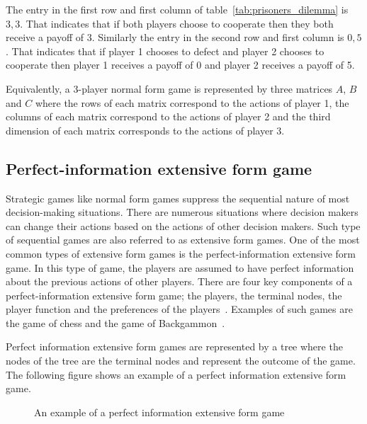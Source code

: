 The entry in the first row and first column of table~\ref{tab:prisoners_dilemma}
is \(3,3\).
That indicates that if both players choose to cooperate then they both receive
a payoff of 3.
Similarly the entry in the second row and first column is \(0,5\).
That indicates that if player 1 chooses to defect and player 2 chooses to
cooperate then player 1 receives a payoff of 0 and player 2 receives a payoff
of 5.

Equivalently, a 3-player normal form game is represented by three matrices
\(A\), \(B\) and \(C\) where the rows of each matrix correspond to the actions
of player 1, the columns of each matrix correspond to the actions of player 2
and the third dimension of each matrix corresponds to the actions of player 3.




\subsection{Perfect-information extensive form game}

Strategic games like normal form games suppress the sequential nature of most
decision-making situations.
There are numerous situations where decision makers can change their actions
based on the actions of other decision makers.
Such type of sequential games are also referred to as extensive form games.
One of the most common types of extensive form games is the perfect-information
extensive form game.
In this type of game, the players are assumed to have perfect information
about the previous actions of other
players.
There are four key components of a perfect-information extensive form game; the
players, the terminal nodes, the player function and the preferences of the
players~\cite{osborne2004_extensive_form_games}.
Examples of such games are the game of chess and the game of
Backgammon~\cite{hart1992games}.

Perfect information extensive form games are represented by a tree where the
nodes of the tree are the terminal nodes and represent the outcome of the
game.
The following figure shows an example of a perfect information extensive form
game.

\begin{figure}[H]
    \centering
    
    \caption{An example of a perfect information extensive form game}
    \label{fig:extensive_form_game}
\end{figure}

